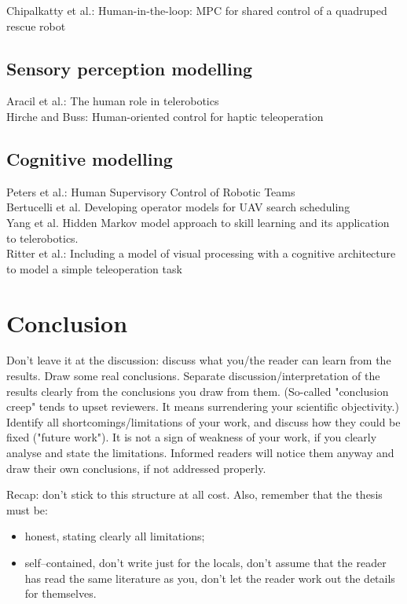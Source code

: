 \documentclass[a4paper,twoside, openright,12pt]{report}
\begin{document}
Chipalkatty et al.: Human-in-the-loop: MPC for shared control of a quadruped rescue robot      
\section{Sensory perception modelling}
Aracil et al.: The human role in telerobotics\\
Hirche and Buss: Human-oriented control for haptic teleoperation
\section{Cognitive modelling}
Peters et al.: Human Supervisory Control of Robotic Teams\\
Bertucelli et al. Developing operator models for {UAV} search scheduling\\
Yang et al. Hidden Markov model approach to skill learning and its application to telerobotics.\\
Ritter et al.: Including a model of visual processing with a cognitive architecture to model a simple teleoperation task\\








\chapter{Conclusion}

Don't leave it at the discussion: discuss what you/the reader can learn from the results. Draw some real conclusions. Separate discussion/interpretation of the results clearly from the conclusions you draw from them. (So-called "conclusion creep" tends to upset reviewers. It means surrendering your scientific objectivity.) Identify all shortcomings/limitations of your work, and discuss how they could be fixed ("future work"). It is not a sign of weakness of your work, if you clearly analyse and state the limitations. Informed readers will notice them anyway and draw their own conclusions, if not addressed properly.

\vspace{\baselineskip}
Recap: don't stick to this structure at all cost. Also, remember that the thesis must be:

\begin{itemize}
	\item honest, stating clearly all limitations;
	\item self--contained, don't write just for the locals, don't assume that the reader has read the same literature as you, don't let the reader work out the details for themselves.
\end{itemize}
\end{document}
